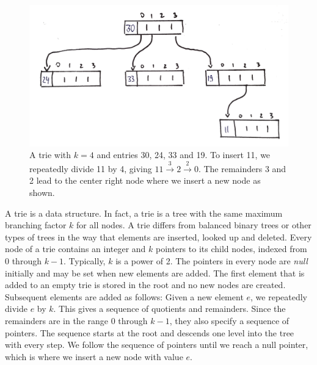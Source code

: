 
\begin{figure}
	\centering
	\includegraphics[width=\textwidth]{topic/imgtries/sampletrie_drawn_transp}
	\caption{ \small A trie with $k = 4$ and entries 30, 24, 33 and 19.
		To insert 11, we repeatedly divide 11 by 4, giving
			$11 \overset{3}{\longrightarrow} 2  \overset{2}{\longrightarrow} 0$. The remainders 3 and 2 lead to the center right node where we insert a new node as shown.}
\end{figure}


A trie \cite{knuth:tries} is a data structure.
In fact, a trie is a tree with the same maximum branching factor $k$ for all nodes.
A trie differs from balanced binary trees or other types of trees in the way that elements are inserted, looked up and deleted.
Every node of a trie contains an integer and $k$ pointers to its child nodes, indexed from 0 through $k - 1$.
Typically, $k$ is a power of 2.
The pointers in every node are \emph{null} initially and may be set when new elements are added.
The first element that is added to an empty trie is stored in the root and no new nodes are created.
Subsequent elements are added as follows:
Given a new element $e$, we repeatedly divide $e$ by $k$.
This gives a sequence of quotients and remainders.
Since the remainders are in the range 0 through $k - 1$, they also specify a sequence of pointers.
The sequence starts at the root and descends one level into the tree with every step.
We follow the sequence of pointers until we reach a null pointer, which is where we insert a new node with value $e$.
